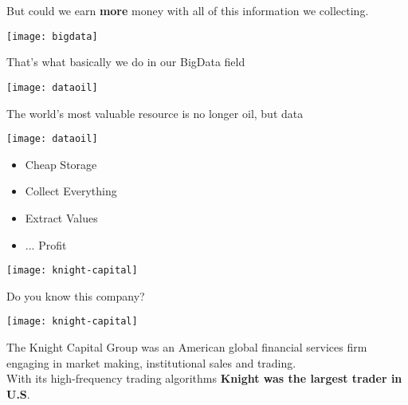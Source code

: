 \documentclass[aspectratio=169, 15pt,usenames,dvipsnames]{beamer}
\begin{document}
\begin{gdsw}
	\par\centering\Large
	But could we earn {\bf more} money with all of this information we collecting.\\        
	\note{
		
	}
\end{gdsw}
\begin{gdsw}
	\centering\texttt{[image: bigdata]}
	\par
	That's what basically we do in our BigData field
\end{gdsw}
\begin{gdsw}
	\centering\texttt{[image: dataoil]}
	\par
	The world’s most valuable resource is no longer oil, but data
\end{gdsw}
\begin{gdsw}
	\centering\texttt{[image: dataoil]}
	\par	
	\begin{center}	
		\begin{minipage}{.7\textwidth}			
			\LARGE
			\begin{itemize}
				\item Cheap Storage
				\item Collect Everything
				\item Extract Values
				\item ... Profit
			\end{itemize}
		\end{minipage}
	\end{center}
\end{gdsw}
\begin{gdsw}
	\centering\texttt{[image: knight-capital]}
	\par\LARGE
	Do you know this company? 
\end{gdsw}
\begin{gdsw}
	\centering\texttt{[image: knight-capital]} 
	\par
	The Knight Capital Group was an American global financial services firm engaging in market making, institutional sales and trading.\\
	With its high-frequency trading algorithms {\bf Knight was the largest trader in U.S}.        
\end{gdsw}
\end{document}
